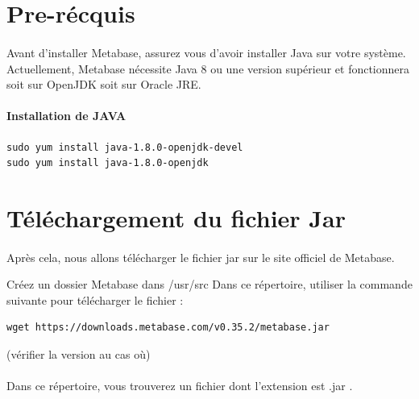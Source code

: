 \documentclass[a4paper,12pt]{report}
\begin{document}
\section{Pre-récquis} 

\paragraph*{}
Avant d’installer Metabase, assurez vous  d’avoir installer Java sur votre système. Actuellement, Metabase nécessite Java 8 ou une version supérieur  et fonctionnera soit sur OpenJDK soit sur Oracle JRE.

\paragraph{Installation de JAVA}
\lstset{
language=SQL,
basicstyle=\footnotesize,
}
\begin{lstlisting}
sudo yum install java-1.8.0-openjdk-devel
sudo yum install java-1.8.0-openjdk

\end{lstlisting}

\section{Téléchargement du fichier Jar}

\paragraph*{}
Après cela, nous allons télécharger le fichier jar sur le site officiel de Metabase.\newline\newline 

Créez un dossier Metabase dans /usr/src
Dans ce répertoire, utiliser la commande suivante pour télécharger le fichier : \newline

\lstset{
language=SQL,
basicstyle=\footnotesize,
}
\begin{lstlisting}
wget https://downloads.metabase.com/v0.35.2/metabase.jar
\end{lstlisting}
 (vérifier la version au cas où)  

\paragraph*{}
Dans ce répertoire, vous trouverez  un fichier dont l'extension est .jar . 
\end{document}
